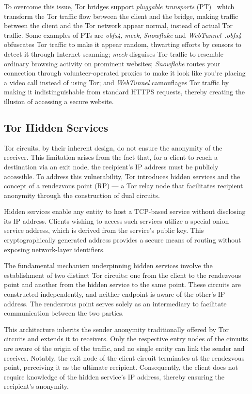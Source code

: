 To overcome this issue, Tor bridges support \textit{pluggable transports} (PT)~\cite{PlugTrans} which transform the Tor traffic flow between the client and the bridge, making traffic between the client and the Tor network appear normal, instead of actual Tor traffic. Some examples of PTs are \textit{obfs4}, \textit{meek}, \textit{Snowflake} and \textit{WebTunnel}~\cite{Circumvention}.\@ \textit{obfs4} obfuscates Tor traffic to make it appear random, thwarting efforts by censors to detect it through Internet scanning; \textit{meek} disguises Tor traffic to resemble ordinary browsing activity on prominent websites; \textit{Snowflake} routes your connection through volunteer-operated proxies to make it look like you're placing a video call instead of using Tor; and \textit{WebTunnel} camouflages Tor traffic by making it indistinguishable from standard HTTPS requests, thereby creating the illusion of accessing a secure website.

\subsection{Tor Hidden Services}\label{subsec:tor_hidden_services}
Tor circuits, by their inherent design, do not ensure the anonymity of the receiver. This limitation arises from the fact that, for a client to reach a destination via an exit node, the recipient's IP address must be publicly accessible. To address this vulnerability, Tor introduces hidden services and the concept of a rendezvous point (RP) — a Tor relay node that facilitates recipient anonymity through the construction of dual circuits.

Hidden services enable any entity to host a TCP-based service without disclosing its IP address. Clients wishing to access such services utilize a special onion service address, which is derived from the service's public key. This cryptographically generated address provides a secure means of routing without exposing network-layer identifiers.

The fundamental mechanism underpinning hidden services involve the establishment of two distinct Tor circuits: one from the client to the rendezvous point and another from the hidden service to the same point. These circuits are constructed independently, and neither endpoint is aware of the other's IP address. The rendezvous point serves solely as an intermediary to facilitate communication between the two parties.

This architecture inherits the sender anonymity traditionally offered by Tor circuits and extends it to receivers. Only the respective entry nodes of the circuits are aware of the origin of the traffic, and no single entity can link the sender and receiver. Notably, the exit node of the client circuit terminates at the rendezvous point, perceiving it as the ultimate recipient. Consequently, the client does not require knowledge of the hidden service's IP address, thereby ensuring the recipient's anonymity.

